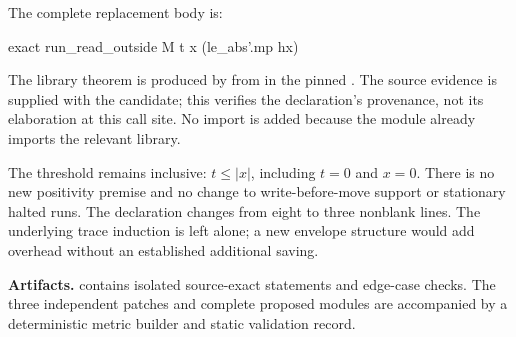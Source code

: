 The complete replacement body is:

\begin{Lean}
  exact run_read_outside M t x (le_abs'.mp hx)
\end{Lean}

The library theorem is produced by  from  in the pinned . The source evidence is supplied with the candidate; this verifies the declaration's provenance, not its elaboration at this call site. No import is added because the module already imports the relevant library.

The threshold remains inclusive: \(t\leq |x|\), including \(t=0\) and \(x=0\). There is no new positivity premise and no change to write-before-move support or stationary halted runs. The declaration changes from eight to three nonblank lines. The underlying trace induction is left alone; a new envelope structure would add overhead without an established additional saving.

\textbf{Artifacts.}  contains isolated source-exact statements and edge-case checks. The three independent patches and complete proposed modules are accompanied by a deterministic metric builder and static validation record.
